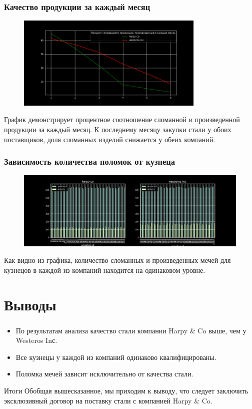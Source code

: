 \documentclass[10pt,pdf,hyperref={unicode}]{beamer}
\begin{document}
\begin{frame}
\frametitle{Качество продукции за каждый месяц}
\begin{figure}[t]
    \centering
    \includegraphics[width=0.8\textwidth]{2.png}
\end{figure}
График демонстрирует процентное соотношение сломанной и произведенной продукции за каждый месяц. К последнему месяцу закупки стали у обоих поставщиков, доля сломанных изделий снижается у обеих компаний.
\end{frame}

\begin{frame}
\frametitle{Зависимость количества поломок от кузнеца}
\begin{figure}[t]
    \centering
    \includegraphics[width=1.0\textwidth]{5.png}
\end{figure}
Как видно из графика, количество сломанных и произведенных мечей для кузнецов в каждой из компаний находится на одинаковом уровне.
\end{frame}

\section{Выводы}

\begin{frame}
\frametitle{\insertsection}
    \begin{itemize}
        \item По результатам анализа качество стали компании Harpy \& Co выше, чем у Westeros Inс.
        \item Все кузнецы у каждой из компаний одинаково квалифицированы. 
        \item Поломка мечей зависит исключительно от качества стали.
    \end{itemize}
    
    \begin{block}{Итоги}
    Обобщая вышесказанное, мы приходим к выводу, что следует заключить эксклюзивный договор на поставку стали с компанией Harpy \& Co.
    \end{block}
\end{frame}
\end{document}

